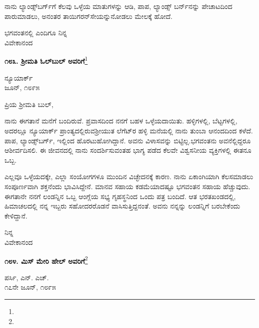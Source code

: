 ನಾನು ಲ್ಯಾಂಡ್ಸ್‌ಬರ್ಗ್‌ಗೆ ಕೆಲವು ಒಳ್ಳೆಯ ಮಾತುಗಳನ್ನು ಆಡಿ, ಪಾಪ, ಲ್ಯಾಂಡ್ಸ್ ಬರ್ನ್‌ನನ್ನು ಪೇಚಾಟದಿಂದ ಪಾರುಮಾಡಲು, ಅನಂತರ ತಾಯಿಗರನ್‌ಸೇಯನ್ನು\break ನೋಡಲು ಮೇಲಕ್ಕೆ ಹೋದೆ.

\vspace{-0.5cm}

{\flushright
ಭಗವಂತನಲ್ಲಿ ಎಂದಿಗೂ ನಿನ್ನ\\ವಿವೇಕಾನಂದ\par}

\begin{center}
\textbf{೧೮೩. ಶ‍್ರೀಮತಿ ಓಲ್‌ಬುಲ್‌ ಅವರಿಗೆ}\footnote{}
\end{center}

\begin{flushright}
ನ್ಯೂಯಾರ್ಕ್\\ಜೂನ್, ೧೮೯೫
\end{flushright}

\noindent
ಪ್ರಿಯ ಶ‍್ರೀಮತಿ ಬುಲ್,

ನಾನು ಈಗತಾನೆ ಮನೆಗೆ ಬಂದಿರುವೆ. ಪ್ರವಾಸದಿಂದ ನನಗೆ ಬಹಳ ಒಳ್ಳೆಯ\break ದಾಯಿತು. ಹಳ್ಳಿಗಳಲ್ಲಿ, ಬೆಟ್ಟಗಳಲ್ಲಿ, ಅದರಲ್ಲೂ ನ್ಯೂಯಾರ್ಕ್ ಪ್ರಾಂತ್ಯದಲ್ಲಿರುವ\break ಶ‍್ರೀಯುತ ಲೆಗೆಟ್‌ರ ಹಳ್ಳಿ ಮನೆಯಲ್ಲಿ ನಾನು ತುಂಬಾ ಆನಂದದಿಂದ ಕಳೆದೆ. ಪಾಪ, ಲ್ಯಾಂಡ್ಸ್‌ಬರ್ಗ್, ಇಲ್ಲಿಂದ ಹೊರಟುಹೋಗಿದ್ದಾನೆ. ಅವನು ವಿಳಾಸವನ್ನು ಬಿಟ್ಟಿಲ್ಲ.\break ಭಗವಂತನು ಅವನೆಲ್ಲಿದ್ದರೂ ಆಶೀರ್ವದಿಸಲಿ. ಈ ಜೀವನದಲ್ಲಿ ನಾನು ಸಂದರ್ಶಿಸುವಂತಹ ಭಾಗ್ಯ ಪಡೆದ ಕೆಲವೇ ವಿಶ್ವಸನೀಯ ವ್ಯಕ್ತಿಗಳಲ್ಲಿ ಈತನೂ ಒಬ್ಬ.

\vspace{0.1cm}

ಎಲ್ಲವೂ ಒಳ್ಳೆಯದಕ್ಕೇ, ಎಲ್ಲಾ ಸಂಯೋಗಗಳೂ ಮುಂದಿನ ವಿಚ್ಛೇದನಕ್ಕೆ ಕಾರಣ. ನಾನು ಏಕಾಂಗಿಯಾಗಿ ಕೆಲಸಮಾಡಲು ಸಂಪೂರ್ಣವಾಗಿ ಶಕ್ತನೆಂದು ಭಾವಿಸಿದ್ದೇನೆ. ಮಾನವ ಸಹಾಯ ಕಡಮೆಯಾದಷ್ಟೂ ಭಗವಂತನ ಸಹಾಯ ಹೆಚ್ಚುವುದು. ಈಗತಾನೇ ನನಗೆ ಲಂಡನ್ನಿನ ಒಬ್ಬ ಆಂಗ್ಲೆಯ ಸಭ್ಯ ಗೃಹಸ್ಥನಿಂದ ಒಂದು ಪತ್ರ ಬಂದಿದೆ. ಆತ ಭರತಖಂಡದಲ್ಲಿ, ಹಿಮಾಚಲದಲ್ಲಿ ನನ್ನ ಇಬ್ಬರು ಸಹೋದರರೊಡನೆ ವಾಸಿಸುತ್ತಿದ್ದನಂತೆ. ಅವನು ನನ್ನನ್ನು ಲಂಡನ್ನಿಗೆ ಬರಬೇಕೆಂದು ಕೇಳಿದ್ದಾನೆ.

{\flushright
ನಿನ್ನ\\ವಿವೇಕಾನಂದ\par}

\begin{center}
\textbf{೧೮೪. ಮಿಸ್ ಮೇರಿ ಹೇಲ್ ಅವರಿಗೆ}\footnote{}
\end{center}

\vspace{-0.7cm}

\begin{flushright}
ಪರ್ಸಿ, ಎನ್. ಎಚ್.\\೧೭ನೇ ಜೂನ್, ೧೮೯೫
\end{flushright}

